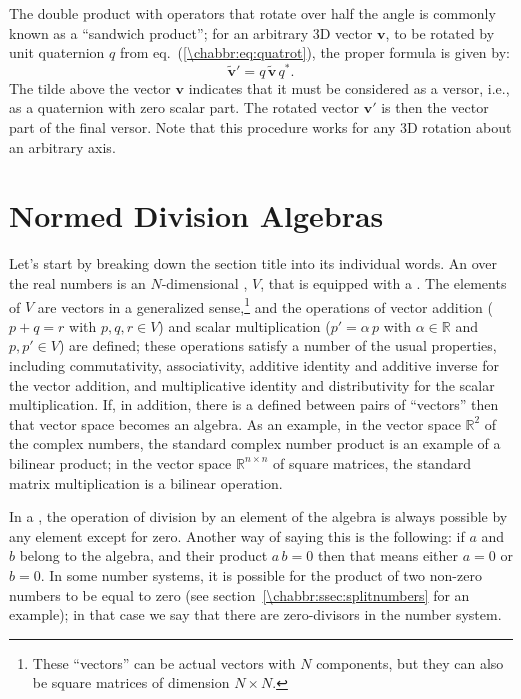 The double product with operators that rotate over half the angle is commonly known as a ``sandwich product''; for an arbitrary 3D vector $\mathbf{v}$, to be rotated by unit quaternion $q$ from eq.~(\ref{\chabbr:eq:quatrot}), the proper formula is given by:
\begin{equation}
	\tilde{\mathbf{v}}' = q\,\tilde{\mathbf{v}}\,q^{\ast}.\label{\chabbr:eq:quatvecrot}
\end{equation}
The tilde above the vector $\mathbf{v}$ indicates that it must be considered as a versor, i.e., as a quaternion with zero scalar part. The rotated vector $\mathbf{v}'$ is then the vector part of the final versor.  Note that this procedure works for any 3D rotation about an arbitrary axis.



\section{Normed Division Algebras}
\label{\chabbr:sec:algebras}

Let's start by breaking down the section title into its individual words. An  over the real numbers is an $N$-dimensional  , $V$, that is equipped with a . The elements of $V$ are vectors in a generalized sense,\footnote{These ``vectors'' can be actual vectors with $N$ components, but they can also be square matrices of dimension $N\times N$.} and the operations of vector addition ($p+q=r$ with $p,q,r\in V$) and scalar multiplication ($p'=\alpha\, p$ with $\alpha\in\mathbb{R}$ and $p,p'\in V$) are defined; these operations satisfy a number of the usual properties, including commutativity, associativity, additive identity and additive inverse for  the vector addition, and multiplicative identity and distributivity for the scalar multiplication.  If, in addition, there is a  defined between pairs of ``vectors'' then that vector space becomes an algebra. As an example, in the vector space $\mathbb{R}^2$ of the complex numbers, the standard complex number product is an example of a bilinear product; in the vector space $\mathbb{R}^{n\times n}$ of square matrices, the standard matrix multiplication is a bilinear operation.

In a , the operation of division by an element of the algebra is always possible by any element except for zero.  Another way of saying this is the following: if $a$ and $b$ belong to the algebra, and their product $a\,b=0$ then that means either $a=0$ or $b=0$. In some number systems, it is possible for the product of two non-zero numbers to be equal to zero (see section~\ref{\chabbr:ssec:splitnumbers} for an example); in that case we say that there are zero-divisors in the number system.  

